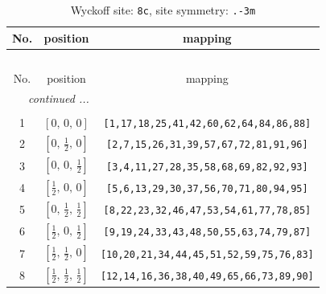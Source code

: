 \documentclass[fleqn,8pt]{jsarticle}
\begin{document}
\begin{longtable}{ccc}
\caption{Wyckoff site: {\tt 8c}, site symmetry: {\tt .-3m}}
 \\
 \hline \hline
No. & position & mapping \\ \hline \endfirsthead

\multicolumn{2}{l}{\tablename\ \thetable{}} \\
 \hline \hline
No. & position & mapping \\ \hline \endhead

 \hline \hline
\multicolumn{2}{r}{\footnotesize\it continued ...} \\ \endfoot

 \hline \hline
\multicolumn{2}{r}{} \\ \endlastfoot

1 & $\left[ 0,\, 0,\, 0 \right]$ & {\tt [1,17,18,25,41,42,60,62,64,84,86,88]} \\ \hline
2 & $\left[ 0,\, \frac{1}{2},\, 0 \right]$ & {\tt [2,7,15,26,31,39,57,67,72,81,91,96]} \\ \hline
3 & $\left[ 0,\, 0,\, \frac{1}{2} \right]$ & {\tt [3,4,11,27,28,35,58,68,69,82,92,93]} \\ \hline
4 & $\left[ \frac{1}{2},\, 0,\, 0 \right]$ & {\tt [5,6,13,29,30,37,56,70,71,80,94,95]} \\ \hline
5 & $\left[ 0,\, \frac{1}{2},\, \frac{1}{2} \right]$ & {\tt [8,22,23,32,46,47,53,54,61,77,78,85]} \\ \hline
6 & $\left[ \frac{1}{2},\, 0,\, \frac{1}{2} \right]$ & {\tt [9,19,24,33,43,48,50,55,63,74,79,87]} \\ \hline
7 & $\left[ \frac{1}{2},\, \frac{1}{2},\, 0 \right]$ & {\tt [10,20,21,34,44,45,51,52,59,75,76,83]} \\ \hline
8 & $\left[ \frac{1}{2},\, \frac{1}{2},\, \frac{1}{2} \right]$ & {\tt [12,14,16,36,38,40,49,65,66,73,89,90]} \\
\end{longtable}
\renewcommand{\arraystretch}{1.2}
\end{document}
